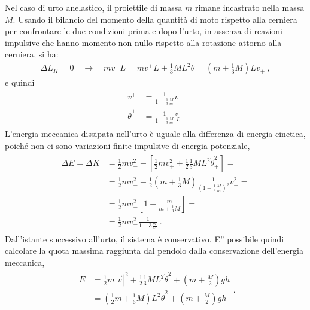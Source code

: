 \documentclass[letterpaper,10pt,italian]{jupyterBook}
\begin{document}
\sphinxAtStartPar
{} Nel caso di urto anelastico, il proiettile di massa \(m\) rimane incastrato nella massa \(M\). Usando il bilancio del momento della quantità di moto rispetto alla cerniera per confrontare le due condizioni prima e dopo l’urto, in assenza di reazioni impulsive che hanno momento non nullo rispetto alla rotazione attorno alla cerniera, si ha:
\begin{equation*}
\begin{split}\Delta L_H = 0 \quad \rightarrow \quad m v^- L = m v^+ L + \frac{1}{3} M L^2 \dot{\theta} = \left( m + \frac{1}{3} M \right) L v_+ \ ,\end{split}
\end{equation*}
\sphinxAtStartPar
e quindi
\begin{equation*}
\begin{split}\begin{aligned}
   v^+            & = \frac{1}{1+ \frac{1}{3} \frac{M}{m}} v^-  \\
   \dot{\theta}^+ & = \frac{1}{1+ \frac{1}{3} \frac{M}{m}} \frac{v^-}{L}  
\end{aligned}\end{split}
\end{equation*}
\sphinxAtStartPar
L’energia meccanica dissipata nell’urto è uguale alla differenza di energia cinetica, poiché non ci sono variazioni finite impulsive di energia potenziale,
\begin{equation*}
\begin{split}\begin{aligned}
  \Delta E = \Delta K 
  & = \frac{1}{2} m v_-^2 - \left[ \frac{1}{2} m v_+^2 + \frac{1}{2} \frac{1}{3} M L^2 \dot{\theta}_+^2 \right]= \\
  & = \frac{1}{2} m v_-^2 - \frac{1}{2} \left( m + \frac{1}{3}M \right) \frac{1}{\left( 1 + \frac{1}{3}\frac{M}{m} \right)^2} v_-^2 = \\
  & = \frac{1}{2} m v_-^2 \left[ 1 - \frac{m}{m+ \frac{1}{3} M} \right] = \\
  & = \frac{1}{2} m v_-^2 \frac{1}{1 + 3\frac{m}{M}} \ .
\end{aligned}\end{split}
\end{equation*}
\sphinxAtStartPar
Dall’istante successivo all’urto, il sistema è conservativo. E” possibile quindi calcolare la quota massima raggiunta dal pendolo dalla conservazione dell’energia meccanica,
\begin{equation*}
\begin{split}\begin{aligned}
  E & = \frac{1}{2} m |\vec{v}|^2 + \frac{1}{2} \frac{1}{3} M L^2 \dot{\theta}^2 + \left(m + \frac{M}{2} \right) g h \\
    & = \left( \frac{1}{2} m + \frac{1}{6} M \right) L^2 \dot{\theta}^2 + \left( m + \frac{M}{2} \right) g h \\
\end{aligned}.\end{split}
\end{equation*}
\end{document}
